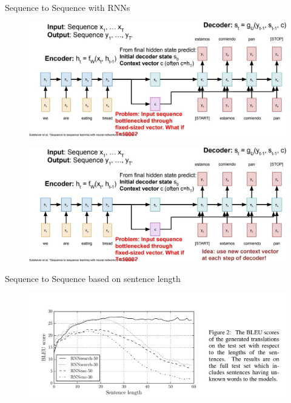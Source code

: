 \begin{frame}[allowframebreaks]{Sequence to Sequence with RNNs}
    \framebreak

    \begin{figure}
        \centering
        \includegraphics[width=1.05\textwidth,keepaspectratio]{images/rnn/slide_11_1_img.jpg}
    \end{figure}

    \framebreak

    \begin{figure}
        \centering
        \includegraphics[width=1.05\textwidth,keepaspectratio]{images/rnn/slide_12_1_img.jpg}
    \end{figure}
\end{frame}


\begin{frame}[allowframebreaks]{Sequence to Sequence based on sentence length}
    \begin{figure}
        \centering
        \includegraphics[width=1.05\textwidth,keepaspectratio]{images/rnn/slide_13_1_img.png}
    \end{figure}
\end{frame}


